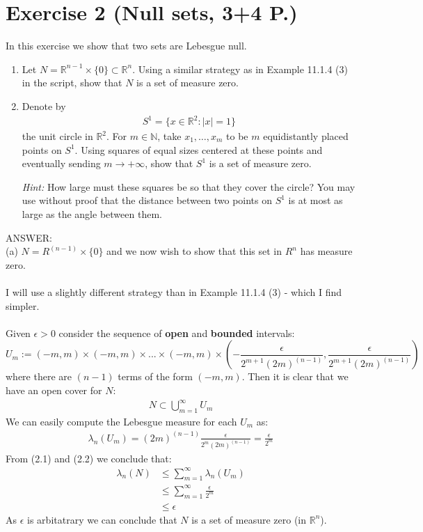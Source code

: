 \documentclass[12pt,a4paper]{article}
\begin{document}
\section*{Exercise 2 (Null sets, 3+4 P.)}
In this exercise we show that two sets are Lebesgue null.
\begin{enumerate}[label=(\alph*)]
\item Let $N=\mathbb{R}^{n-1}\times\{0\}\subset\mathbb{R}^n$. Using a similar strategy as in Example 11.1.4 (3) in the script, show that $N$ is a set of measure zero.
\item Denote by
\begin{align*}
S^1=\{x\in\mathbb{R}^2:|x|=1\}
\end{align*}
the unit circle in $\mathbb{R}^2$. For $m\in\mathbb{N}$, take $x_1,\ldots,x_m$ to be $m$ equidistantly placed points on $S^1$. Using squares of equal sizes centered at these points and eventually sending $m\to+\infty$, show that $S^1$ is a set of measure zero.

\textit{Hint:} How large must these squares be so that they cover the circle? You may use without proof that the distance between two points on $S^1$ is at most as large as the angle between them.
\end{enumerate}
ANSWER:\\
(a) $N=R^{(n-1)} \times \{0\}$ and we now wish to show that this set in $R^n$ has measure zero.\\
\\
I will use a slightly different strategy than in Example 11.1.4 (3) - which I find simpler.\\
\\
Given $\epsilon > 0$ consider the sequence of \textbf{open} and \textbf{bounded} intervals:
$$U_m := (-m, m) \times (-m, m) \times ... \times (-m, m) \times (-\frac{\epsilon}{2^{m+1}(2m)^{(n-1)}}, \frac{\epsilon}{2^{m+1}(2m)^{(n-1)}}) $$
where there are $(n-1)$ terms of the form $(-m, m)$.  Then it is clear that we have an open cover for $N$:
\begin{align*}
N \subset \bigcup_{m=1}^{\infty} U_m \tag{2.1}
\end{align*}
We can easily compute the Lebesgue measure for each $U_m$ as:
\begin{align*}
\lambda_n (U_m) = (2m)^{(n-1)} \frac{\epsilon}{2^m(2m)^{(n-1)}} = \frac{\epsilon}{2^m} \tag{2.2}
\end{align*}
From (2.1) and (2.2) we conclude that:
\begin{align*}
\lambda_n (N) &\le \sum_{m=1}^{\infty} \lambda_n(U_m) \\
  &\le \sum_{m=1}^{\infty} \frac{\epsilon}{2^m} \\
  &\le \epsilon
\end{align*}
As $\epsilon$ is arbitatrary we can conclude that $N$ is a set of measure zero (in $\mathbb{R}^n$).
\end{document}
